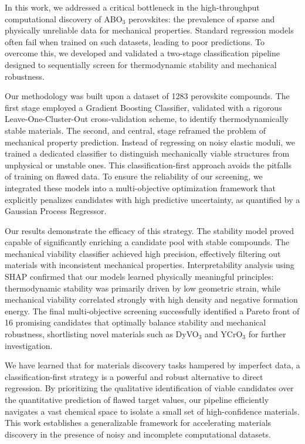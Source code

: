 \documentclass[]{article}
\begin{document}
In this work, we addressed a critical bottleneck in the high-throughput computational discovery of ABO$_3$ perovskites: the prevalence of sparse and physically unreliable data for mechanical properties. Standard regression models often fail when trained on such datasets, leading to poor predictions. To overcome this, we developed and validated a two-stage classification pipeline designed to sequentially screen for thermodynamic stability and mechanical robustness.

Our methodology was built upon a dataset of 1283 perovskite compounds. The first stage employed a Gradient Boosting Classifier, validated with a rigorous Leave-One-Cluster-Out cross-validation scheme, to identify thermodynamically stable materials. The second, and central, stage reframed the problem of mechanical property prediction. Instead of regressing on noisy elastic moduli, we trained a dedicated classifier to distinguish mechanically viable structures from unphysical or unstable ones. This classification-first approach avoids the pitfalls of training on flawed data. To ensure the reliability of our screening, we integrated these models into a multi-objective optimization framework that explicitly penalizes candidates with high predictive uncertainty, as quantified by a Gaussian Process Regressor.

Our results demonstrate the efficacy of this strategy. The stability model proved capable of significantly enriching a candidate pool with stable compounds. The mechanical viability classifier achieved high precision, effectively filtering out materials with inconsistent mechanical properties. Interpretability analysis using SHAP confirmed that our models learned physically meaningful principles: thermodynamic stability was primarily driven by low geometric strain, while mechanical viability correlated strongly with high density and negative formation energy. The final multi-objective screening successfully identified a Pareto front of 16 promising candidates that optimally balance stability and mechanical robustness, shortlisting novel materials such as DyVO$_3$ and YCrO$_3$ for further investigation.

We have learned that for materials discovery tasks hampered by imperfect data, a classification-first strategy is a powerful and robust alternative to direct regression. By prioritizing the qualitative identification of viable candidates over the quantitative prediction of flawed target values, our pipeline efficiently navigates a vast chemical space to isolate a small set of high-confidence materials. This work establishes a generalizable framework for accelerating materials discovery in the presence of noisy and incomplete computational datasets.
\end{document}
